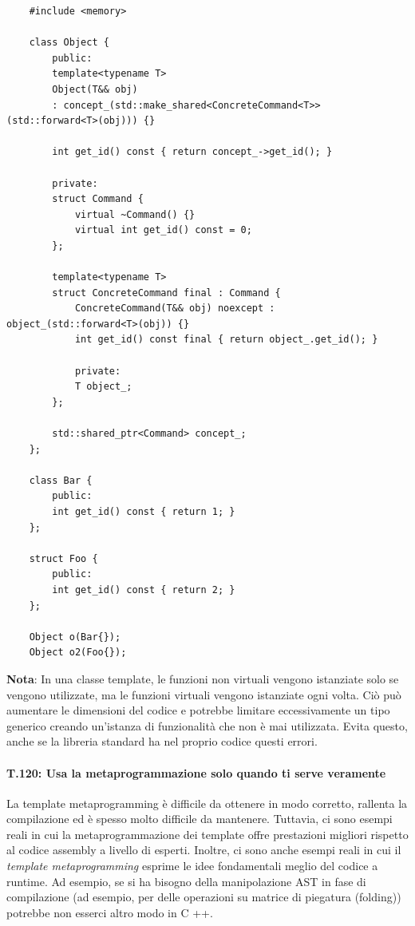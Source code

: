 \begin{lstlisting}
	#include <memory>
	
	class Object {
		public:
		template<typename T>
		Object(T&& obj)
		: concept_(std::make_shared<ConcreteCommand<T>>(std::forward<T>(obj))) {}
		
		int get_id() const { return concept_->get_id(); }
		
		private:
		struct Command {
			virtual ~Command() {}
			virtual int get_id() const = 0;
		};
		
		template<typename T>
		struct ConcreteCommand final : Command {
			ConcreteCommand(T&& obj) noexcept : object_(std::forward<T>(obj)) {}
			int get_id() const final { return object_.get_id(); }
			
			private:
			T object_;
		};
		
		std::shared_ptr<Command> concept_;
	};
	
	class Bar {
		public:
		int get_id() const { return 1; }
	};
	
	struct Foo {
		public:
		int get_id() const { return 2; }
	};
	
	Object o(Bar{});
	Object o2(Foo{});
\end{lstlisting}

\textsf{\small \textbf{Nota}: In una classe template, le funzioni non virtuali vengono istanziate solo se vengono utilizzate, ma le funzioni virtuali vengono istanziate ogni volta. Ciò può aumentare le dimensioni del codice e potrebbe limitare eccessivamente un tipo generico creando un'istanza di funzionalità che non è mai utilizzata. Evita questo, anche se la libreria standard ha nel proprio codice questi errori.} \\ %

\paragraph{T.120: Usa la metaprogrammazione solo quando ti serve veramente}

\textsf{\small La template metaprogramming è difficile da ottenere in modo corretto, rallenta la compilazione ed è spesso molto difficile da mantenere. Tuttavia, ci sono esempi reali in cui la metaprogrammazione dei template offre prestazioni migliori rispetto al codice assembly a livello di esperti. Inoltre, ci sono anche esempi reali in cui il \emph{template metaprogramming} esprime le idee fondamentali meglio del codice a runtime. Ad esempio, se si ha bisogno della manipolazione AST in fase di compilazione (ad esempio, per delle operazioni su matrice di piegatura (folding)) potrebbe non esserci altro modo in C ++.} \\ %

